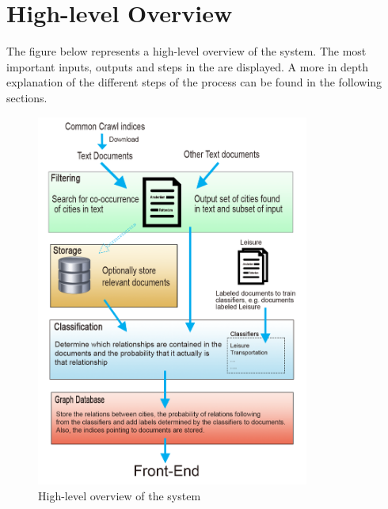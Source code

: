 \section{High-level Overview}
The figure below represents a high-level overview of the system. The most important inputs, outputs and steps in the are displayed. A more in depth explanation of the different steps of the process can be found in the following sections.
\begin{figure}[h]
\centering
\includegraphics[width=0.8\textwidth]{System-overview-3}
\caption{High-level overview of the system}
\label{fig:overview}
\end{figure}